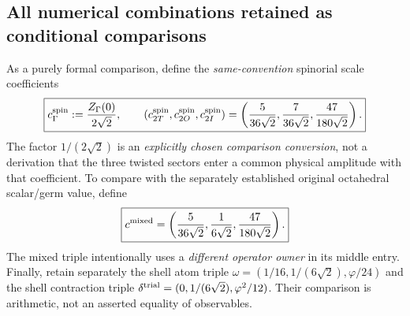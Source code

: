 \documentclass[11pt]{article}
\begin{document}
\subsection{All numerical combinations retained as conditional comparisons}
\label{p1b:subsec:v11-weighted-comparisons}

\begin{definition}
\label{p1b:def:v11-comparison-triples}
As a purely formal comparison, define the \emph{same-convention}
spinorial scale coefficients
\[
\boxed{c_{\Gamma}^{\rm spin}:=\frac{Z_\Gamma(0)}{2\sqrt2},\qquad
(c_{2T}^{\rm spin},c_{2O}^{\rm spin},c_{2I}^{\rm spin})
=\left(\frac5{36\sqrt2},\frac7{36\sqrt2},
\frac{47}{180\sqrt2}\right).}
\]
The factor $1/(2\sqrt2)$ is an \emph{explicitly chosen comparison
conversion}, not a derivation that the three twisted sectors enter a
common physical amplitude with that coefficient.  To compare with the
separately established original octahedral scalar/germ value, define
\[
\boxed{c^{\rm mixed}
 =\left(\frac5{36\sqrt2},\frac1{6\sqrt2},
\frac{47}{180\sqrt2}\right).}
\]
The mixed triple intentionally uses a \emph{different operator owner}
in its middle entry.  Finally, retain separately the shell atom triple
$\omega=(1/16,1/(6\sqrt2),\varphi/24)$ and the shell
contraction triple
$\delta^{\rm trial}=(0,1/(6\sqrt2),\varphi^2/12)$.
Their comparison is arithmetic, not an asserted equality of observables.
\end{definition}
\end{document}
